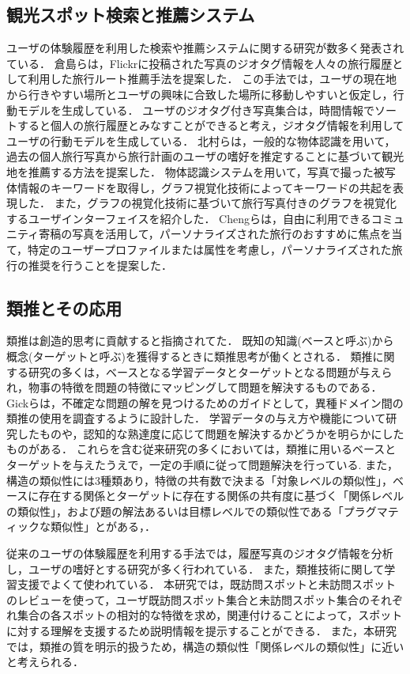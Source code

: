 \documentclass{deimj}
\begin{document}
\subsection{観光スポット検索と推薦システム}
ユーザの体験履歴を利用した検索や推薦システムに関する研究が数多く発表されている．
倉島ら\cite{Codd01}は，Flickrに投稿された写真のジオタグ情報を人々の旅行履歴として利用した旅行ルート推薦手法を提案した．
この手法では，ユーザの現在地から行きやすい場所とユーザの興味に合致した場所に移動しやすいと仮定し，行動モデルを生成している．
ユーザのジオタグ付き写真集合は，時間情報でソートすると個人の旅行履歴とみなすことができると考え，ジオタグ情報を利用してユーザの行動モデルを生成している．
北村らは\cite{Codd02}，一般的な物体認識を用いて，過去の個人旅行写真から旅行計画のユーザの嗜好を推定することに基づいて観光地を推薦する方法を提案した．
物体認識システムを用いて，写真で撮った被写体情報のキーワードを取得し，グラフ視覚化技術によってキーワードの共起を表現した．
また，グラフの視覚化技術に基づいて旅行写真付きのグラフを視覚化するユーザインターフェイスを紹介した．
Chengらは\cite{Codd03}，自由に利用できるコミュニティ寄稿の写真を活用して，パーソナライズされた旅行のおすすめに焦点を当て，特定のユーザープロファイルまたは属性を考慮し，パーソナライズされた旅行の推奨を行うことを提案した．

\subsection{類推とその応用}
類推は創造的思考に貢献すると指摘されてた\cite{Codd04}．
既知の知識(ベースと呼ぶ)から概念(ターゲットと呼ぶ)を獲得するときに類推思考が働くとされる\cite{Codd05}．
類推に関する研究の多くは，ベースとなる学習データとターゲットとなる問題が与えられ，物事の特徴を問題の特徴にマッピングして問題を解決するもの\cite{Codd06}である．
Gickらは，不確定な問題の解を見つけるためのガイドとして，異種ドメイン間の類推の使用を調査するように設計した．
学習データの与え方や機能について研究したもの\cite{Codd07}や，認知的な熟達度に応じて問題を解決するかどうかを明らかにしたもの\cite{Codd08}がある．
これらを含む従来研究の多くにおいては，類推に用いるベースとターゲットを与えたうえで，一定の手順に従って問題解決を行っている.
また，構造の類似性には3種類あり，特徴の共有数で決まる「対象レベルの類似性」，ベースに存在する関係とターゲットに存在する関係の共有度に基づく「関係レベルの類似性」，および題の解法あるいは目標レベルでの類似性である「プラグマティックな類似性」とがある\cite{Codd05}，\cite{Codd09}．

従来のユーザの体験履歴を利用する手法では，履歴写真のジオタグ情報を分析し，ユーザの嗜好とする研究が多く行われている．
また，類推技術に関して学習支援でよくて使われている．
本研究では，既訪問スポットと未訪問スポットのレビューを使って，ユーザ既訪問スポット集合と未訪問スポット集合のそれぞれ集合の各スポットの相対的な特徴を求め，関連付けることによって，スポットに対する理解を支援するため説明情報を提示することができる．
また，本研究では，類推の質を明示的扱うため，構造の類似性「関係レベルの類似性」に近いと考えられる．
\end{document}
